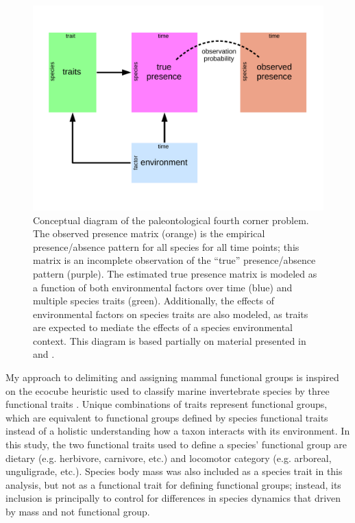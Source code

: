 \documentclass[12pt,letterpaper]{article}
\begin{document}
\begin{figure}[ht]
  \centering
  \includegraphics[width=\textwidth,height=0.4\textheight,keepaspectratio=true]{figure/paleo_fourth_corner}
  \caption[Conceptual diagram of the paleontological fourth-courner problem]{Conceptual diagram of the paleontological fourth corner problem. The observed presence matrix (orange) is the empirical presence/absence pattern for all species for all time points; this matrix is an incomplete observation of the ``true'' presence/absence pattern (purple). The estimated true presence matrix is modeled as a function of both environmental factors over time (blue) and multiple species traits (green). Additionally, the effects of environmental factors on species traits are also modeled, as traits are expected to mediate the effects of a species environmental context. This diagram is based partially on material presented in \citet{Brown2014c} and \citet{Warton2015a}.}
  \label{fig:concept_fourth_corner}
\end{figure}

My approach to delimiting and assigning mammal functional groups is inspired on the ecocube heuristic used to classify marine invertebrate species by three functional traits \citep{Bush2007,Bambach2007,Bush2011,Bush2012b,Novack-Gottshall2007,Villeger2011}. Unique combinations of traits represent functional groups, which are equivalent to functional groups defined by species functional traits instead of a holistic understanding how a taxon interacts with its environment. In this study, the two functional traits used to define a species' functional group are dietary (e.g. herbivore, carnivore, etc.) and locomotor category (e.g. arboreal, unguligrade, etc.). Species body mass was also included as a species trait in this analysis, but not as a functional trait for defining functional groups; instead, its inclusion is principally to control for differences in species dynamics that driven by mass and not functional group.
\end{document}

